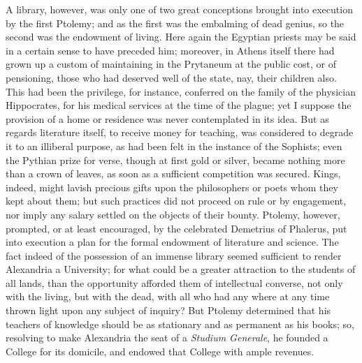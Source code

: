A library, however, was only one of two great conceptions brought
into execution by the first Ptolemy; and as the first was the
embalming of dead genius, so the second was the endowment of living.
Here again the Egyptian priests may be said in a certain sense to have
preceded him; moreover, in Athens itself there had grown up a custom
of maintaining in the Prytaneum at the public cost, or of pensioning,
those who had deserved well of the state, nay, their children also.
This had been the privilege, for instance, conferred on the family of
the physician Hippocrates, for his medical services at the time of the
plague; yet I suppose the provision of a home or residence was never
contemplated in its idea. But as regards literature itself, to receive
money for teaching, was considered to degrade it to an illiberal purpose, as had been felt in the instance of the Sophists; even the
Pythian prize for verse, though at first gold or silver, became
nothing more than a crown of leaves, as soon as a sufficient
competition was secured. Kings, indeed, might lavish precious gifts
upon the philosophers or poets whom they kept about them; but such
practices did not proceed on rule or by engagement, nor imply any
salary settled on the objects of their bounty. Ptolemy, however,
prompted, or at least encouraged, by the celebrated Demetrius of
Phalerus, put into execution a plan for the formal endowment of
literature and science. The fact indeed of the possession of an
immense library seemed sufficient to render Alexandria a University;
for what could be a greater attraction to the students of all lands,
than the opportunity afforded them of intellectual converse, not only
with the living, but with the dead, with all who had any where at any
time thrown light upon any subject of inquiry? But Ptolemy determined
that his teachers of knowledge should be as stationary and as
permanent as his books; so, resolving to make Alexandria the seat of a
\emph{Studium Generale}, he founded a College for its domicile, and
endowed that College with ample revenues.

